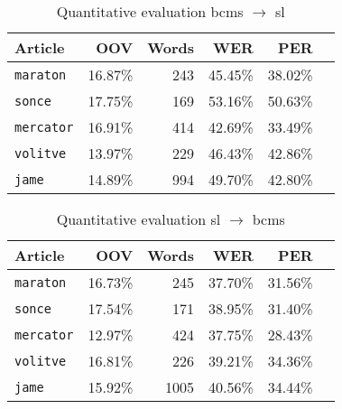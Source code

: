 \begin{table}
\begin{tabular}{lrrrrr}
\textbf{Article} & \textbf{OOV} & \textbf{Words} & \textbf{WER} & \textbf{PER}\\
\hline
\texttt{maraton} & 16.87\% & 243 & 45.45\% & 38.02\% \\ 
\texttt{sonce} & 17.75\% & 169 & 53.16\% & 50.63\% \\
\texttt{mercator} & 16.91\% & 414& 42.69\% & 33.49\% \\
\texttt{volitve} & 13.97\% & 229 & 46.43\% & 42.86\%\\
\texttt{jame} & 14.89\% & 994 & 49.70\% & 42.80\% \\
\hline
\end{tabular}
\caption{ Quantitative evaluation bcms $\rightarrow$ sl}
\end{table}

\begin{table}
\begin{tabular}{lrrrrr}
\textbf{Article} & \textbf{OOV} & \textbf{Words} & \textbf{WER} & \textbf{PER}\\
\hline
\texttt{maraton} & 16.73\% & 245 & 37.70\% & 31.56\% \\ 
\texttt{sonce} & 17.54\% & 171 & 38.95\% & 31.40\% \\
\texttt{mercator} & 12.97\% & 424 & 37.75\% & 28.43\% \\
\texttt{volitve} & 16.81\% & 226 & 39.21\% & 34.36\%\\
\texttt{jame} & 15.92\% & 1005 & 40.56\% & 34.44\% \\
\hline
\end{tabular}
\caption{ Quantitative evaluation sl $\rightarrow$ bcms}
\end{table}

